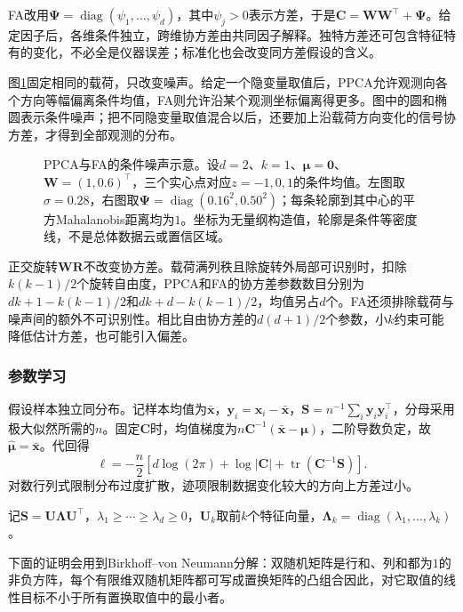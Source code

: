FA改用$\bm{\Psi}=\operatorname{diag}(\psi_1,\ldots,\psi_d)$，其中$\psi_j>0$表示方差，于是$\bm{C}=\bm{W}\bm{W}^\top+\bm{\Psi}$。给定因子后，各维条件独立，跨维协方差由共同因子解释。独特方差还可包含特征特有的变化，不必全是仪器误差；标准化也会改变同方差假设的含义。

图\ref{fig:dim-ppca-fa-noise}固定相同的载荷，只改变噪声。给定一个隐变量取值后，PPCA允许观测向各个方向等幅偏离条件均值，FA则允许沿某个观测坐标偏离得更多。图中的圆和椭圆表示条件噪声；把不同隐变量取值混合以后，还要加上沿载荷方向变化的信号协方差，才得到全部观测的分布。

\begin{figure}[htbp]
  \centering
  
  \caption{PPCA与FA的条件噪声示意。设$d=2$、$k=1$、$\bm{\mu}=\bm{0}$、$\bm{W}=(1,0.6)^\top$，三个实心点对应$z=-1,0,1$的条件均值。左图取$\sigma=0.28$，右图取$\bm{\Psi}=\operatorname{diag}(0.16^2,0.50^2)$；每条轮廓到其中心的平方Mahalanobis距离均为$1$。坐标为无量纲构造值，轮廓是条件等密度线，不是总体数据云或置信区域。}
  \label{fig:dim-ppca-fa-noise}
\end{figure}

正交旋转$\bm{W}\bm{R}$不改变协方差。载荷满列秩且除旋转外局部可识别时，扣除$k(k-1)/2$个旋转自由度，PPCA和FA的协方差参数数目分别为$dk+1-k(k-1)/2$和$dk+d-k(k-1)/2$，均值另占$d$个。FA还须排除载荷与噪声间的额外不可识别性。相比自由协方差的$d(d+1)/2$个参数，小$k$约束可能降低估计方差，也可能引入偏差。

\subsubsection{参数学习}
\label{sec:dim-ppca-learning}

假设样本独立同分布。记样本均值为$\bar{\bm{x}}$，$\bm{y}_i=\bm{x}_i-\bar{\bm{x}}$，$\bm{S}=n^{-1}\sum_i\bm{y}_i\bm{y}_i^\top$，分母采用极大似然所需的$n$。固定$\bm{C}$时，均值梯度为$n\bm{C}^{-1}(\bar{\bm{x}}-\bm{\mu})$，二阶导数负定，故$\hat{\bm{\mu}}=\bar{\bm{x}}$。代回得
\begin{equation}
\label{eq:dim-ppca-likelihood}
\ell=-\frac{n}{2}\left[
d\log(2\pi)+\log|\bm{C}|
+\operatorname{tr}(\bm{C}^{-1}\bm{S})\right].
\end{equation}
对数行列式限制分布过度扩散，迹项限制数据变化较大的方向上方差过小。

记$\bm{S}=\bm{U}\bm{\Lambda}\bm{U}^\top$，$\lambda_1\geq\cdots\geq\lambda_d\geq0$，$\bm{U}_k$取前$k$个特征向量，$\bm{\Lambda}_k=\operatorname{diag}(\lambda_1,\ldots,\lambda_k)$。

下面的证明会用到Birkhoff--von Neumann分解：双随机矩阵是行和、列和都为$1$的非负方阵，每个有限维双随机矩阵都可写成置换矩阵的凸组合因此，对它取值的线性目标不小于所有置换取值中的最小者。

